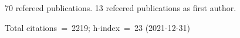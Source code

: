 70 refereed publications. 13 refeered publications as first author.

Total citations~=~2219; h-index~=~23 (2021-12-31)